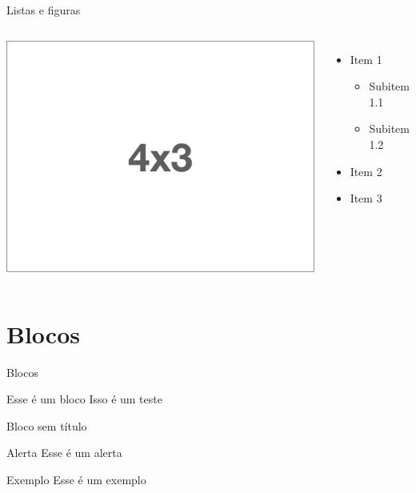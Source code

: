 \documentclass[aspectratio=169]{beamer}
\begin{document}
\begin{frame}{Listas e figuras}
\begin{columns}
     \begin{center}
        \includegraphics[width=\linewidth]{figs/4x3.png}
     \end{center}
    \begin{itemize}
        \item Item 1
        \begin{itemize}
            \item Subitem 1.1
            \item Subitem 1.2
        \end{itemize}
        \item Item 2
        \item Item 3
    \end{itemize}
\end{columns} 
\end{frame}


\section{Blocos}


\begin{frame}{Blocos}
    \begin{block}{Esse é um bloco}
        Isso é um teste
    \end{block}
    \begin{block}{}
    Bloco sem título	
    \end{block}
    \begin{alertblock}{Alerta}
        Esse é um alerta
    \end{alertblock}

    \begin{exampleblock}{Exemplo}
        Esse é um exemplo
    \end{exampleblock}
\end{frame}
\end{document}
